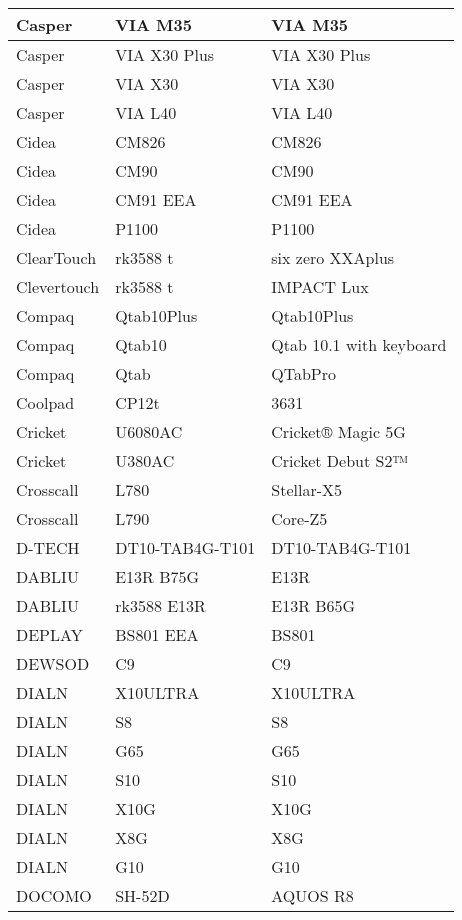 \begin{tabularx}{\linewidth}{|l|X|X|}
        Casper & VIA M35 & VIA M35 \\ \hline
        Casper & VIA X30 Plus & VIA X30 Plus \\ \hline
        Casper & VIA X30 & VIA X30 \\ \hline
        Casper & VIA L40 & VIA L40 \\ \hline
        Cidea & CM826 & CM826 \\ \hline
        Cidea & CM90 & CM90 \\ \hline
        Cidea & CM91 EEA & CM91 EEA \\ \hline
        Cidea & P1100 & P1100 \\ \hline
        ClearTouch & rk3588 t & six zero XXAplus \\ \hline
        Clevertouch & rk3588 t & IMPACT Lux \\ \hline
        Compaq & Qtab10Plus & Qtab10Plus \\ \hline
        Compaq & Qtab10 & Qtab 10.1 with keyboard \\ \hline
        Compaq & Qtab & QTabPro \\ \hline
        Coolpad & CP12t & 3631 \\ \hline
        Cricket & U6080AC & Cricket® Magic 5G \\ \hline
        Cricket & U380AC & Cricket Debut S2™ \\ \hline
        Crosscall & L780 & Stellar-X5 \\ \hline
        Crosscall & L790 & Core-Z5 \\ \hline
        D-TECH & DT10-TAB4G-T101 & DT10-TAB4G-T101 \\ \hline
        DABLIU & E13R B75G & E13R \\ \hline
        DABLIU & rk3588 E13R & E13R B65G \\ \hline
        DEPLAY & BS801 EEA & BS801 \\ \hline
        DEWSOD & C9 & C9 \\ \hline
        DIALN & X10ULTRA & X10ULTRA \\ \hline
        DIALN & S8 & S8 \\ \hline
        DIALN & G65 & G65 \\ \hline
        DIALN & S10 & S10 \\ \hline
        DIALN & X10G & X10G \\ \hline
        DIALN & X8G & X8G \\ \hline
        DIALN & G10 & G10 \\ \hline
        DOCOMO & SH-52D & AQUOS R8 \\ \hline

\end{tabularx}
